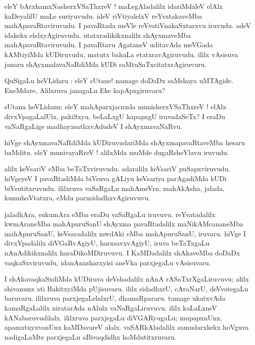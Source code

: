 \documentclass{article}
\begin{document}
\begin{mn}
eleY bArxhamxNasherxVSaThxreV ! maLegAladalilx idariMdaleV elAlx kaDeyalilU maLe suriyuvudu. ideV 
riVtiyalelxV reYvatakaveMba mahApavaRtaviruvudu. I pavaRtada meVle reVvatiVnakaSxtarxvu iruvudu. 
adeV idakekx elelxyAgiruvudu. utatxradikikxnalilx shAyxmaveMba mahApavaRtaviruvudu.
I pavaRtavu AgataneV uditavAda meVGada kAMtiyiMda kUDiruvudu, matutx bahaLa etatxravAgiruvudu. 
ililx vAsisuva janaru shAyxmalavaNaRdiMda kUDi saMtuSaTxcitatxrAgiruvuru.
\end{mn}

\begin{mn}
QuSigaLu heVLidaru : eleY sUtane! namage doDaDx saMshaya uMTAgide. EneMdare, 
Alilxruva janagaLu Eke kapApxgiruvaru?
\end{mn}

\begin{mn}
sUtanu heVLidanu: eleY mahAparxjacnxda munisherxVSaThxreV ! elAlx divxVpagaLalUlx, pakiSxyu,
beLaLxgU kapapxgU iruvadaSeTx? I eraDu vaNaRgaLige madhayxsathxvAdudeV I shAyxmavaNaRvu.
\end{mn}

\begin{mn}
hiVge shAyxmavaNaRdiMda kUDiruvudariMda shAyxmapavaRtaveMba hesaru baMditu. eleY munivayaRreV !
alilxMda muMde dugaRsheYlavu iruvudu.
\end{mn}

\begin{mn}
alilx keVsariV eMba beTaTxviruvudu. adaralilx keVsariV puSapxviruvudu.
hiVgeyeV I pavaRtadiMda biVsuva gALiyu keVsariya parAgadiMda kUDi biVsutitxruvudu.
ililxruva vaSaRgaLu mahAmeVru, mahAkAsha, jalada, kumuhoVtatxra, eMdu parxsidadhxvAgiruvuvu.
\end{mn}

\begin{mn}
jaladhAra, sukumAra eMba eraDu vaSaRgaLu iruvuvu. 
reYvatadalilx kwmAraneMba mahApuruSanU shAyxma pavaRtadalilx maNikAMcananeMba mahApuruSanU, 
keVsaradalilx mwdAki eMba mahApuruSanU, iruvaru. hiVge I divxVpadalilx diVGaRvAgiyU, 
harxsavxvAgiyU, iruva beTaTxgaLu nAnAdikikxnalilx haraDikoMDiruvuvu. I KaMDadalilx shAkaveMba 
doDaDx vaqkaSxviruvudu, idanAnxsharxyisi aneVka parxjegaLu vAsisuvaru.
\end{mn}

\begin{mn}
I shAkavaqkaSxdiMda kUDiruva deVshadalilx nAnA rASaTxrXgaLiruvuvu; alilx shivanunx ati BakitxyiMda 
pUjisuvaru. ililx sidadhxrU, cAraNarU, deVvategaLu baruvaru. ililxruva parxjegaLelalxrU, 
dhamaRpararu. tamage ukatxvAda kamaRgaLalilx niratarAda nAlulx vaNaRgaLiruvuvu. 
ililx kaLaLxneV kANabaruvudilalx. ililxruva parxjegaLu diVGARyugaLu; mupapxnUnx, apamxtuyxvanUnx
kaMDavareV alalx. vaSARkAladalilx samudarxkekx hoVguva nadigaLaMte parxjegaLu aBivaqdidhx 
hoMdutitxruvaru.
\end{mn}
\end{document}
